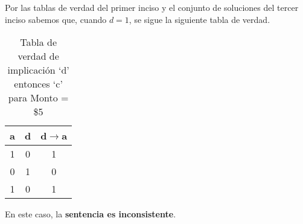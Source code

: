 Por las tablas de verdad del primer inciso y el conjunto de soluciones del tercer inciso sabemos que, cuando $d = 1$, se sigue la siguiente tabla de verdad.
\begin{table}[!ht]
    \centering
    \begin{tabular}{|c|c|c|}
        \hline
        a & d & d$\rightarrow$a \\
        \hline
        1 & 0 & 1 \\
        \hline
        0 & 1 & 0 \\
        \hline
        1 & 0 & 1 \\
        \hline
    \end{tabular}
    \caption{Tabla de verdad de implicación `d' entonces `c' para Monto = \$5}\label{table:d-then-c-5}
\end{table}

En este caso, la \textbf{sentencia es inconsistente}.